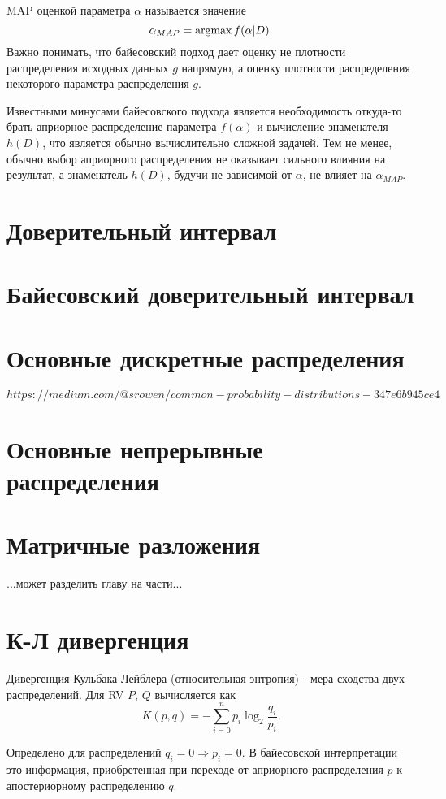 MAP оценкой параметра $\alpha$ называется значение
$$
\alpha_{MAP} = \operatorname*{argmax} f(\alpha | D).
$$
Важно понимать, что байесовский подход дает оценку не плотности распределения исходных данных $g$ напрямую, а оценку плотности распределения некоторого параметра распределения $g$.

Известными минусами байесовского подхода является необходимость откуда-то брать априорное распределение параметра $f(\alpha)$ и вычисление знаменателя $h(D)$, что является обычно вычислительно сложной задачей. Тем не менее, обычно выбор априорного распределения не оказывает сильного влияния на результат, а знаменатель $h(D)$, будучи не зависимой от $\alpha$, не влияет на $\alpha_{MAP}$.


\section{Доверительный интервал}


\section{Байесовский доверительный интервал}


\section{Основные дискретные распределения}

$https://medium.com/@srowen/common-probability-distributions-347e6b945ce4$


\section{Основные непрерывные распределения}


\section{Матричные разложения}

...может разделить главу на части...


\section{К-Л дивергенция}

Дивергенция Кульбака-Лейблера (относительная энтропия) - мера сходства двух распределений. Для RV $P$, $Q$ вычисляется как
$$
K(p, q) = -\sum_{i=0}^np_i\log_2\frac{q_i}{p_i}.
$$

Определено для распределений $q_i = 0 \Rightarrow p_i=0$.
В байесовской интерпретации это информация, приобретенная при переходе от априорного распределения $p$ к апостериорному распределению $q$.

